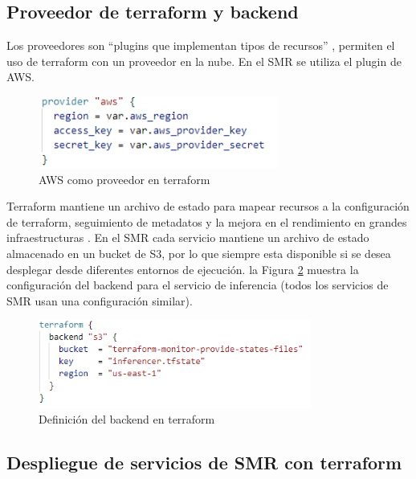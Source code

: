 \subsection{Proveedor de terraform y backend}

Los proveedores son ``plugins que implementan tipos de recursos'' \cite{terraform}, permiten el uso de terraform con un proveedor en la nube. En el SMR se utiliza el plugin de AWS.

\begin{figure}[H]
	\centering
	\includegraphics[width=0.7\textwidth]{bibliografia/Imagenes/providertf.PNG}
	\caption{AWS como proveedor en terraform}
	\label{providertf}
\end{figure}

Terraform mantiene un archivo de estado para mapear recursos a la configuración de terraform, seguimiento de metadatos y la mejora en el rendimiento en grandes infraestructuras \cite{terraform}. En el SMR cada servicio mantiene un archivo de estado almacenado en un bucket de S3, por lo que siempre esta disponible si se desea desplegar desde diferentes entornos de ejecución. la Figura \ref{backendtf}  muestra la configuración del backend para el servicio de inferencia (todos los servicios de SMR usan una configuración similar).

\begin{figure}[H]
	\centering
	\includegraphics[width=0.8\textwidth]{bibliografia/Imagenes/backendtf.PNG}
	\caption{Definición del backend en terraform}
	\label{backendtf}
\end{figure}



\subsection{Despliegue de servicios de SMR con terraform}


